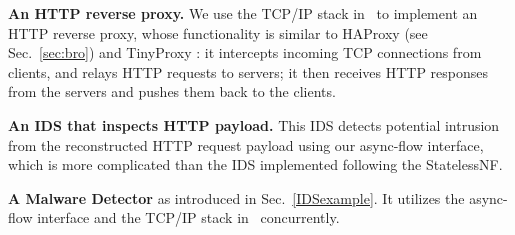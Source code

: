\noindent\textbf{An HTTP reverse proxy.} We use the TCP/IP stack in \netstar~to implement an HTTP reverse proxy, whose functionality is similar to HAProxy (see Sec.~\ref{sec:bro}) and TinyProxy \cite{}: %
it intercepts incoming TCP connections from clients, and relays HTTP requests to servers; it then receives HTTP responses from the servers and pushes them back to the clients. %

\noindent\textbf{An IDS that inspects HTTP payload.} This IDS detects potential intrusion from the reconstructed HTTP request payload using our async-flow interface, which is more complicated than the IDS implemented following the StatelessNF. %



\noindent\textbf{A Malware Detector} as introduced in Sec.~\ref{IDSexample}. %
 It utilizes the async-flow interface and the TCP/IP stack in \netstar~concurrently. %
